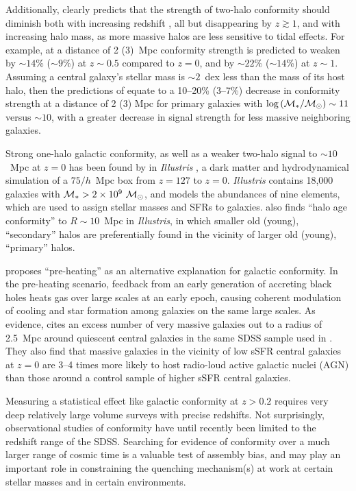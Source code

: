 Additionally, \citet{Hearin15b} clearly predicts that the strength of two-halo conformity should diminish both with increasing redshift , all but disappearing by $z\gtrsim1$, and with increasing halo mass, as more massive halos are less sensitive to tidal effects.
For example, at a distance of 2 (3)~Mpc conformity strength is predicted to weaken by $\sim14$\% ($\sim9$\%) at $z\sim0.5$ compared to $z=0$, and by $\sim22$\% ($\sim14$\%) at $z\sim1$.
Assuming a central galaxy's stellar mass is $\sim2$~dex less than the mass of its host halo, then the predictions of \citet{Hearin15b} equate to a 10--20\% (3--7\%) decrease in conformity strength at a distance of 2 (3) Mpc for primary galaxies with $\logM\sim11$ versus $\sim10$, with a greater decrease in signal strength for less massive neighboring galaxies.

Strong one-halo galactic conformity, as well as a weaker two-halo signal to $\sim10$~Mpc at $z=0$ has been found by \citet{Bray16a} in \emph{Illustris} \citep{Vogelsberger14}, a dark matter and hydrodynamical simulation of a $75/h$~Mpc box from $z=127$ to $z=0$.
\emph{Illustris} contains 18,000 galaxies with $\mstar>2\times10^9~\msun$, and models the abundances of nine elements, which are used to assign stellar masses and SFRs to galaxies.
\citet{Bray16a} also finds ``halo age conformity'' to $R\sim10$~Mpc in \emph{Illustris}, in which smaller old (young), ``secondary'' halos are preferentially found in the vicinity of larger old (young), ``primary'' halos.

\citet{Kauffmann15} proposes ``pre-heating''  as an alternative explanation for galactic conformity.
In the pre-heating scenario, feedback from an early generation of accreting black holes heats gas over large scales at an early epoch, causing coherent modulation of cooling and star formation among galaxies on the same large scales.
As evidence, \citet{Kauffmann15} cites an excess number of very massive galaxies out to a radius of 2.5~Mpc around quiescent central galaxies in the same SDSS sample used in \citet{Kauffmann13}.
They also find that massive galaxies in the vicinity of low sSFR central galaxies at $z=0$ are 3--4 times more likely to host radio-loud active galactic nuclei (AGN) than those around a control sample of higher sSFR central galaxies.


Measuring a statistical effect like galactic conformity at $z>0.2$ requires very deep relatively large volume surveys with precise redshifts.
Not surprisingly, observational studies of conformity have until recently been limited to the redshift range of the SDSS.
Searching for evidence of conformity over a much larger range of cosmic time is a valuable test of assembly bias, and may play an important role in constraining the quenching mechanism(s) at work at certain stellar masses and in certain environments.

